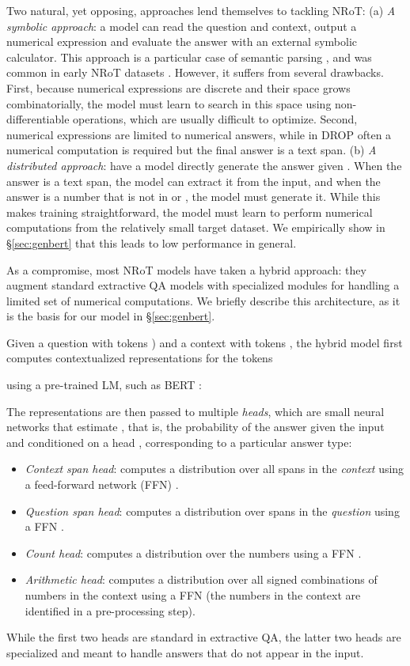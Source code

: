 \documentclass[11pt,a4paper]{article}
\begin{document}
Two natural, yet opposing, approaches lend themselves to tackling NRoT:
(a) \emph{A symbolic approach}: a model can read the question and context, output a numerical expression and evaluate the answer with an external symbolic calculator. This approach is a particular case of semantic parsing \cite{kamath2019survey}, and was common in early NRoT datasets \cite{koncel2015parsing, roy2015solving, hosseini2014learning}. However, it suffers from several drawbacks. First, because numerical expressions are discrete and their space grows combinatorially, the model must learn to search in this space using non-differentiable operations, which are usually difficult to optimize. Second, numerical expressions are limited to numerical answers, while in \textsc{DROP} often a numerical computation is required but the final answer is a text span.
(b) \emph{A distributed approach}: have a model directly generate the answer
given . When the answer is a text span, the model can
extract it from the input, and when the answer is a number that is not in  or
, the model must generate it. While this makes training straightforward, the model must learn to perform numerical computations from the relatively small target dataset. We empirically show in \S\ref{sec:genbert} that this leads to low performance in general.

As a compromise, most NRoT models \cite{dua2019drop, kinley2019nabert, hu2019multi, efrat2019tag} have taken a hybrid approach: they augment standard extractive QA models with specialized modules for handling a limited set of numerical computations.
We briefly describe this architecture, as it is the basis for our
model in \S\ref{sec:genbert}.

Given a question with  tokens ) and a
context with  tokens , the hybrid model
first computes contextualized representations for the  tokens

using a pre-trained LM, such as \textsc{BERT} \cite{devlin2018bert}:

The representations  are then passed to multiple \emph{heads}, which
are small neural networks that estimate , that
is, the probability of the answer given the input and conditioned on a
head , corresponding to a particular answer type:
\begin{itemize}[topsep=0pt,itemsep=0pt,parsep=0pt,partopsep=0pt,leftmargin=*]
    \item \emph{Context span head}: computes a distribution over all spans in the \emph{context} using a feed-forward network (FFN) .
    \item \emph{Question span head}: computes a distribution over spans in the \emph{question} 
    using a FFN .
    \item \emph{Count head}: computes a distribution over the numbers  using a FFN .
    \item \emph{Arithmetic head}: computes a distribution over all signed combinations of numbers in the context using a FFN  (the numbers in the context are identified in a pre-processing step).
\end{itemize}
While the first two heads are standard in extractive QA, the latter two heads are specialized and meant to handle answers that do not appear in the input.
\end{document}

